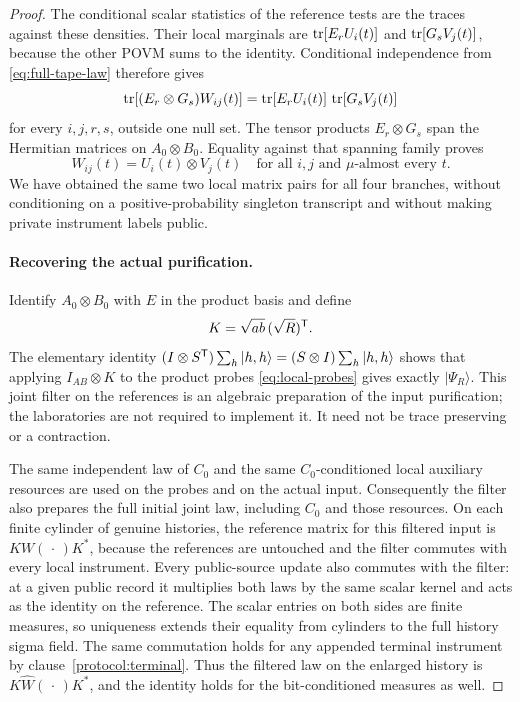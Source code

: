\begin{proof}
The conditional scalar statistics of the reference tests are the
traces against these densities.  Their local marginals are
$\operatorname{tr}[E_rU_i(t)]$ and $\operatorname{tr}[G_sV_j(t)]$, because the other POVM sums to
the identity.  Conditional independence from
\eqref{eq:full-tape-law} therefore gives
\[
 \operatorname{tr}[(E_r\otimes G_s)W_{ij}(t)]
 =\operatorname{tr}[E_rU_i(t)]\,\operatorname{tr}[G_sV_j(t)]
\]
for every $i,j,r,s$, outside one null set.  The tensor products
$E_r\otimes G_s$ span the Hermitian matrices on $A_0\otimes B_0$.
Equality against that spanning family proves
\begin{equation}\label{eq:probe-product}
 W_{ij}(t)=U_i(t)\otimes V_j(t)
 \quad\text{for all }i,j\text{ and $\mu$-almost every }t.
\end{equation}
We have obtained the same two local matrix pairs for all four branches,
without conditioning on a positive-probability singleton transcript
and without making private instrument labels public.

\paragraph{Recovering the actual purification.}
Identify $A_0\otimes B_0$ with $E$ in the product basis and define
\[
 K=\sqrt{ab}\,(\sqrt R)^\mathsf T.
\]
The elementary identity
$(I\otimes S^\mathsf T)\sum_h|h,h\rangle=(S\otimes I)\sum_h|h,h\rangle$
shows that applying $I_{AB}\otimes K$ to the product probes
\eqref{eq:local-probes} gives exactly $|\Psi_R\rangle$.
This joint filter on the references is an algebraic preparation of
the input purification; the laboratories are not required to implement
it.  It need not be trace preserving or a contraction.

The same independent law of $C_0$ and the same $C_0$-conditioned local
auxiliary resources are used on the probes and on the actual input.
Consequently the filter also prepares the full initial joint law,
including $C_0$ and those resources.
On each finite cylinder of genuine histories, the reference matrix
for this filtered input is $K W(\,\cdot\,)K^*$, because the references
are untouched and the filter commutes with every local instrument.
Every public-source update also commutes with the filter: at a given
public record it multiplies both laws by the same scalar kernel and
acts as the identity on the reference.
The scalar entries on both sides are finite measures, so uniqueness
extends their equality from cylinders to the full history sigma field.
The same commutation holds for any appended terminal instrument by
clause~\ref{protocol:terminal}.  Thus the filtered law on the enlarged
history is $K\widehat W(\,\cdot\,)K^*$, and the identity holds for the
bit-conditioned measures as well.


\end{proof}
